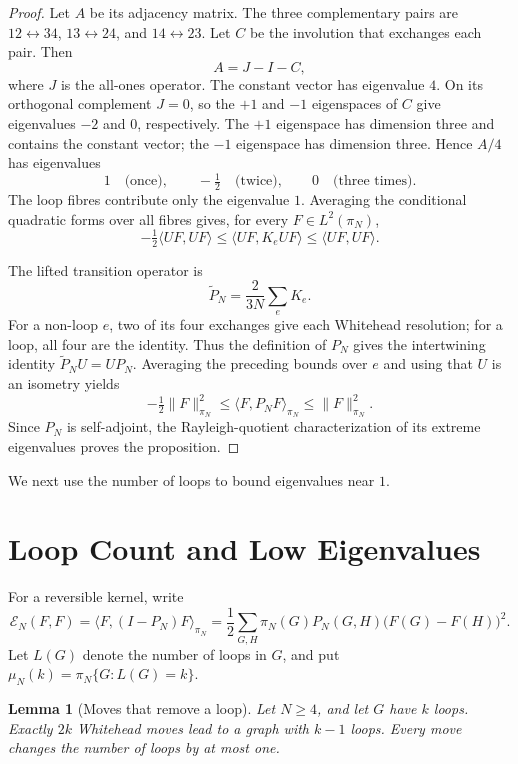 \documentclass[11pt]{article}
\theoremstyle{plain}
\newtheorem{lemma}[lemma]{Lemma}
\theoremstyle{definition}
\numberwithin{equation}{section}
\begin{document}
\begin{proof}
Let $A$ be its adjacency matrix.  The three complementary pairs are
$12\leftrightarrow34$, $13\leftrightarrow24$, and
$14\leftrightarrow23$.  Let $C$ be the involution that exchanges each pair.
Then
\[
  A=J-I-C,
\]
where $J$ is the all-ones operator.  The constant vector has eigenvalue $4$.
On its orthogonal complement $J=0$, so the $+1$ and $-1$ eigenspaces of $C$
give eigenvalues $-2$ and $0$, respectively.  The $+1$ eigenspace has
dimension three and contains the constant vector; the $-1$ eigenspace has
dimension three.  Hence $A/4$ has eigenvalues
\[
  1\quad\text{(once)},\qquad
  -\tfrac12\quad\text{(twice)},\qquad
  0\quad\text{(three times)}.
\]
The loop fibres contribute only the eigenvalue $1$.  Averaging the conditional
quadratic forms over all fibres gives, for every $F\in L^2(\pi_N)$,
\[
  -\tfrac12\langle UF,UF\rangle
  \leq\langle UF,K_eUF\rangle
  \leq\langle UF,UF\rangle.
\]

The lifted transition operator is
\[
 \widetilde P_N=\frac{2}{3N}\sum_e K_e.
\]
For a non-loop $e$, two of its four exchanges give each Whitehead resolution;
for a loop, all four are the identity.  Thus the definition of $P_N$ gives the
intertwining identity $\widetilde P_NU=UP_N$.  Averaging the preceding bounds
over $e$ and using that $U$ is an isometry yields
\[
 -\tfrac12\|F\|_{\pi_N}^2
 \leq\langle F,P_NF\rangle_{\pi_N}
 \leq\|F\|_{\pi_N}^2.
\]
Since $P_N$ is self-adjoint, the Rayleigh-quotient characterization of its
extreme eigenvalues proves the proposition.
\end{proof}

We next use the number of loops to bound eigenvalues near $1$.

\section{Loop Count and Low Eigenvalues}\label{sec:loops}

For a reversible kernel, write
\begin{equation}\label{eq:dirichlet}
  \mathcal E_N(F,F)
  =\langle F,(I-P_N)F\rangle_{\pi_N}
  =\frac12\sum_{G,H}\pi_N(G)P_N(G,H)
       \bigl(F(G)-F(H)\bigr)^2.
\end{equation}
Let $L(G)$ denote the number of loops in $G$, and put
$\mu_N(k)=\pi_N\{G:L(G)=k\}$.

\begin{lemma}[Moves that remove a loop]\label{lem:loop-moves}
Let $N\geq4$, and let $G$ have $k$ loops.  Exactly $2k$ Whitehead moves lead
to a graph with $k-1$ loops.  Every move changes the number of loops by at
most one.
\end{lemma}
\end{document}
